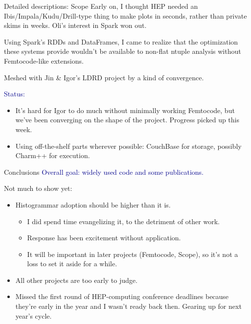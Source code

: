 \documentclass{beamer}
\begin{document}
\begin{frame}{Detailed descriptions: Scope}
\vspace{0.5 cm}
Early on, I thought HEP needed an Ibis/Impala/Kudu/Drill-type thing to make plots in seconds, rather than private skims in weeks. Oli's interest in Spark won out.

\vspace{0.4 cm}
Using Spark's RDDs and DataFrames, I came to realize that the optimization these systems provide wouldn't be available to non-flat ntuple analysis without Femtocode-like extensions.

\vspace{0.4 cm}
Meshed with Jin \& Igor's LDRD project by a kind of convergence.

\vspace{0.4 cm}
\textcolor{darkblue}{Status:}
\begin{itemize}
\item It's hard for Igor to do much without minimally working Femtocode, but we've been converging on the shape of the project. Progress picked up this week.
\item Using off-the-shelf parts wherever possible: CouchBase for storage, possibly Charm++ for execution.
\end{itemize}
\end{frame}

\begin{frame}{Conclusions}
\textcolor{darkblue}{Overall goal: widely used code and some publications.}

\vspace{0.25 cm}
Not much to show yet:

\begin{itemize}
\item Histogrammar adoption should be higher than it is.
\begin{itemize}
\item I did spend time evangelizing it, to the detriment of other work.
\item Response has been excitement without application.
\item It will be important in later projects (Femtocode, Scope), so it's not a loss to set it aside for a while.
\end{itemize}

\item All other projects are too early to judge.

\item Missed the first round of HEP-computing conference deadlines because they're early in the year and I wasn't ready back then. Gearing up for next year's cycle.
\end{itemize}
\end{frame}
\end{document}

